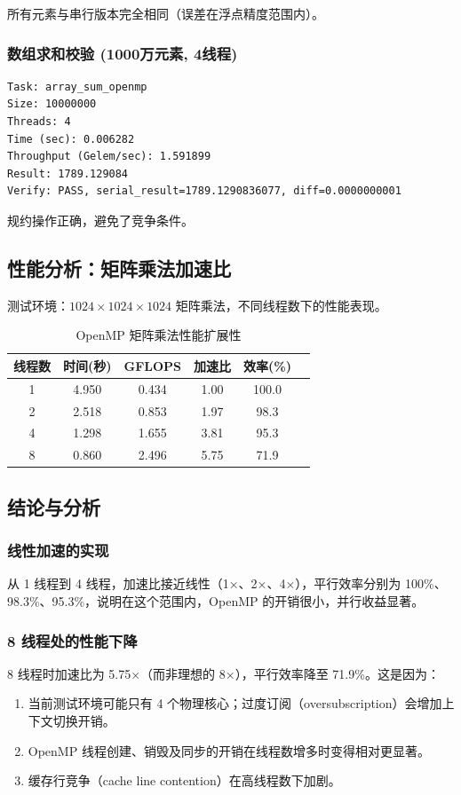 \documentclass[12pt,a4paper]{ctexart}
\begin{document}
所有元素与串行版本完全相同（误差在浮点精度范围内）。

\subsubsection{数组求和校验 (1000万元素, 4线程)}
\begin{lstlisting}
Task: array_sum_openmp
Size: 10000000
Threads: 4
Time (sec): 0.006282
Throughput (Gelem/sec): 1.591899
Result: 1789.129084
Verify: PASS, serial_result=1789.1290836077, diff=0.0000000001
\end{lstlisting}

规约操作正确，避免了竞争条件。

\subsection{性能分析：矩阵乘法加速比}
测试环境：$1024 \times 1024 \times 1024$ 矩阵乘法，不同线程数下的性能表现。

\begin{table}[h]
\centering
\caption{OpenMP 矩阵乘法性能扩展性}
\begin{tabular}{cccccc}
\toprule
\textbf{线程数} & \textbf{时间(秒)} & \textbf{GFLOPS} & \textbf{加速比} & \textbf{效率(\%)} \\
\midrule
1  & 4.950  & 0.434  & 1.00  & 100.0 \\
2  & 2.518  & 0.853  & 1.97  & 98.3  \\
4  & 1.298  & 1.655  & 3.81  & 95.3  \\
8  & 0.860  & 2.496  & 5.75  & 71.9  \\
\bottomrule
\end{tabular}
\end{table}

\subsection{结论与分析}

\subsubsection{线性加速的实现}
从 1 线程到 4 线程，加速比接近线性（1×、2×、4×），平行效率分别为 100\%、98.3\%、95.3\%，说明在这个范围内，OpenMP 的开销很小，并行收益显著。

\subsubsection{8 线程处的性能下降}
8 线程时加速比为 5.75×（而非理想的 8×），平行效率降至 71.9\%。这是因为：
\begin{enumerate}[itemsep=0.2em]
  \item 当前测试环境可能只有 4 个物理核心；过度订阅（oversubscription）会增加上下文切换开销。
  \item OpenMP 线程创建、销毁及同步的开销在线程数增多时变得相对更显著。
  \item 缓存行竞争（cache line contention）在高线程数下加剧。
\end{enumerate}
\end{document}
